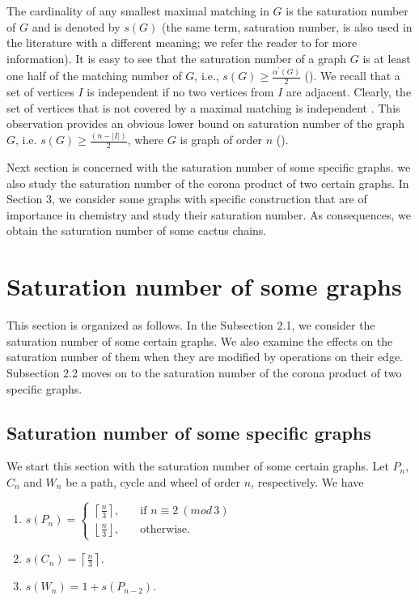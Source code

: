 \documentclass[11pt]{article}
\begin{document}
\medskip
The cardinality of any smallest maximal matching in $G$ is the saturation number of $G$ and is denoted by $s(G)$ (the same term, saturation number, is also used in the literature with a different meaning; we refer the reader to \cite{Fad} for more information). It is easy to see that the saturation number of a graph $G$ is at least one half of the matching number of $G$, i.e., $s(G)\geq \frac{\alpha^{\prime}(G)}{2}$ (\cite{Dos}). We recall that a set of vertices $I$ is independent if no two vertices from $I$ are adjacent. Clearly, the set of vertices that is not covered by a maximal matching is independent \cite{Edm}. This observation provides an obvious lower bound on saturation number of the graph $G$, i.e. $s(G)\geq \frac{(n-|I|)}{2}$, where $G$ is graph of order $n$ (\cite{Ves}).

\medskip 
Next section is concerned with the saturation number of some specific graphs. we also study the saturation number of the corona product of two certain graphs. In Section 3, we consider some graphs with specific construction that are of importance in chemistry and study their saturation number. As consequences, we obtain the saturation number of some cactus chains. 

\section{Saturation number of some graphs}

This section is organized as follows. In the Subsection 2.1, we consider the saturation number of some certain graphs.
We also examine the effects on the saturation number of them when they are modified by operations on their edge. Subsection 2.2 moves on to the saturation number of the corona product of two specific graphs.  

\subsection{Saturation number of some specific graphs} 

We start this section with the saturation number of some certain graphs. Let $P_n$, $C_n$ and $W_n$ be a path, cycle 
and wheel of order $n$, respectively. We have 
     \begin{enumerate}
            \item[(i)] $s(P_n)=\left\{
\begin{array}{lcl}
\left\lceil{\frac{n}{3}}\right\rceil, & \quad\mbox{if $n\equiv 2 ~ (mod\, 3)$}\\[15pt]
\left\lfloor{\frac{n}{3}}\right\rfloor, & \quad\mbox{otherwise.}
\end{array}
\right.$
           \item[(ii)] $s(C_n)=\left\lceil{\frac{n}{3}}\right\rceil$.
           \item[(iii)] $s(W_n)=1+s(P_{n-2})$.
      \end{enumerate}
\end{document}
